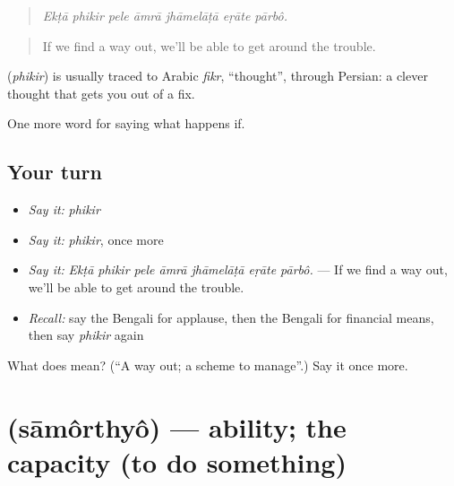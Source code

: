 \begin{quote}
      
\end{quote}

\begin{quote}
\emph{Ekṭā phikir pele āmrā jhāmelāṭā eṛāte pārbô.}
\end{quote}

\begin{quote}
If we find a way out, we'll be able to get around the trouble.
\end{quote}

\begin{cousinweb}
\textbf{} (\emph{phikir}) is usually traced to Arabic \emph{fikr}, \textquotedblleft{}thought\textquotedblright{}, through Persian: a clever thought that gets you out of a fix.
\end{cousinweb}

\begin{grammarlens}[title={What you've built}]
One more word for saying what happens if.
\end{grammarlens}

\subsection*{Your turn}
\begin{itemize}
\raggedright
  \item \emph{Say it:} \emph{phikir}
  \item \emph{Say it:} \emph{phikir}, once more
  \item \emph{Say it:} \emph{Ekṭā phikir pele āmrā jhāmelāṭā eṛāte pārbô.} — If we find a way out, we'll be able to get around the trouble.
  \item \emph{Recall:} say the Bengali for applause, then the Bengali for financial means, then say \emph{phikir} again
\end{itemize}

\begin{tcolorbox}[breakable,colback=teal!4,colframe=teal!35!black,title={Before you move on}]
What does  mean? (\textquotedblleft{}A way out; a scheme to manage\textquotedblright{}.) Say it once more.
\end{tcolorbox}
\section[\texorpdfstring{\bn{সামর্থ্য} (sāmôrthyô)}{সামর্থ্য (sāmôrthyô)}]{ (sāmôrthyô) — ability; the capacity (to do something)}

